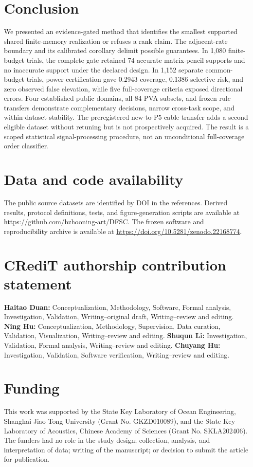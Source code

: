 \documentclass[11pt]{article}
\begin{document}
\section{Conclusion}
We presented an evidence-gated method that identifies the smallest supported shared finite-memory realization or refuses a rank claim. The adjacent-rate boundary and its calibrated corollary delimit possible guarantees. In 1,080 finite-budget trials, the complete gate retained 74 accurate matrix-pencil supports and no inaccurate support under the declared design. In 1,152 separate common-budget trials, power certification gave 0.2943 coverage, 0.1386 selective risk, and zero observed false elevation, while five full-coverage criteria exposed directional errors. Four established public domains, all 84 PVA subsets, and frozen-rule transfers demonstrate complementary decisions, narrow cross-task scope, and within-dataset stability. The preregistered new-to-P5 cable transfer adds a second eligible dataset without retuning but is not prospectively acquired. The result is a scoped statistical signal-processing procedure, not an unconditional full-coverage order classifier.

\section*{Data and code availability}
The public source datasets are identified by DOI in the references. Derived results, protocol definitions, tests, and figure-generation scripts are available at \url{https://github.com/hzhooning-art/DFSC}. The frozen software and reproducibility archive is available at \url{https://doi.org/10.5281/zenodo.22168774}.

\section*{CRediT authorship contribution statement}
\textbf{Haitao Duan:} Conceptualization, Methodology, Software, Formal analysis, Investigation, Validation, Writing--original draft, Writing--review and editing. \textbf{Ning Hu:} Conceptualization, Methodology, Supervision, Data curation, Validation, Visualization, Writing--review and editing. \textbf{Shuqun Li:} Investigation, Validation, Formal analysis, Writing--review and editing. \textbf{Chuyang Hu:} Investigation, Validation, Software verification, Writing--review and editing.

\section*{Funding}
This work was supported by the State Key Laboratory of Ocean Engineering, Shanghai Jiao Tong University (Grant No. GKZD010089), and the State Key Laboratory of Acoustics, Chinese Academy of Sciences (Grant No. SKLA202406). The funders had no role in the study design; collection, analysis, and interpretation of data; writing of the manuscript; or decision to submit the article for publication.
\end{document}
